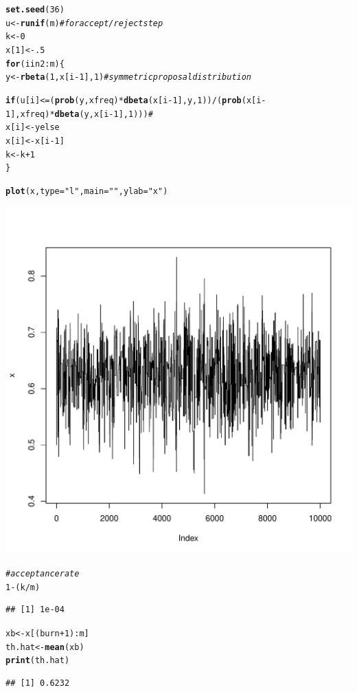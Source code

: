 \documentclass{article}\usepackage[]{graphicx}\usepackage[]{color}
\makeatletter
\def\maxwidth{ %
  \ifdim\Gin@nat@width>\linewidth
    \linewidth
  \else
    \Gin@nat@width
  \fi
}
\newcommand{\hlstr}[1]{\textcolor[rgb]{0.192,0.494,0.8}{#1}}%
\newcommand{\hlcom}[1]{\textcolor[rgb]{0.678,0.584,0.686}{\textit{#1}}}%
\newcommand{\hlkwd}[1]{\textcolor[rgb]{0.737,0.353,0.396}{\textbf{#1}}}%
\newenvironment{kframe}{%
 \def\at@end@of@kframe{}%
 \ifinner\ifhmode%
  \def\at@end@of@kframe{\end{minipage}}%
  \begin{minipage}{\columnwidth}%
 \fi\fi%
 \def\FrameCommand##1{\hskip\@totalleftmargin \hskip-\fboxsep
 \colorbox{shadecolor}{##1}\hskip-\fboxsep
     \hskip-\linewidth \hskip-\@totalleftmargin \hskip\columnwidth}%
 \MakeFramed {\advance\hsize-\width
   \@totalleftmargin\z@ \linewidth\hsize
   \@setminipage}}%
 {\par\unskip\endMakeFramed%
 \at@end@of@kframe}
\newenvironment{knitrout}{}{} %
\makeatother
\begin{document}
\begin{itemize}
\begin{knitrout}
\color{fgcolor}\begin{kframe}
\begin{alltt}
\hlkwd{set.seed}(36)
u <- \hlkwd{runif}(m) \hlcom{#for accept/reject step}
k<-0
x[1] <- .5
\hlkwd{for} (i in 2:m) \{
    y <- \hlkwd{rbeta}(1, x[i-1], 1)  \hlcom{# symmetric proposal distribution}
    
  \hlkwd{if} (u[i] <= (\hlkwd{prob}(y, xfreq)*\hlkwd{dbeta}(x[i-1],y,1)) / (\hlkwd{prob}(x[i-1], xfreq)*\hlkwd{dbeta}(y,x[i-1],1)))\hlcom{#}
    x[i] <- y  else
        x[i] <- x[i-1]
        k <- k+1
\}

\hlkwd{plot}( x, type=\hlstr{"l"}, main=\hlstr{""}, ylab=\hlstr{"x"})
\end{alltt}
\end{kframe}
\includegraphics[width=\maxwidth]{figure/nine62} 
\begin{kframe}\begin{alltt}
\hlcom{#acceptance rate}
1-(k/m)
\end{alltt}
\begin{verbatim}
## [1] 1e-04
\end{verbatim}
\begin{alltt}

xb <- x[(burn+1):m]
th.hat<-\hlkwd{mean}(xb)
\hlkwd{print}(th.hat)
\end{alltt}
\begin{verbatim}
## [1] 0.6232
\end{verbatim}
\begin{alltt}


\end{alltt}
\end{kframe}
\end{knitrout}
\end{itemize}
\end{document}
